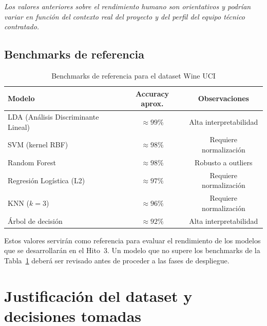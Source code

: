\vspace{1mm}

\textit{Los valores anteriores sobre el rendimiento humano son orientativos y podrían variar 
en función del contexto real del proyecto y del perfil del equipo 
técnico contratado.}

\subsection{Benchmarks de referencia}

\begin{table}[H]
    \centering
        \caption{Benchmarks de referencia para el dataset Wine UCI
             \cite{UCIWine,Aeberhard1994,James2021,Hastie2009,Breiman2001,Cortes1995,Fisher1936}}
    \begin{tabular}{lcc}
        \toprule
        \textbf{Modelo} & \textbf{Accuracy aprox.} & \textbf{Observaciones} \\
        \midrule
        LDA (An\'alisis Discriminante Lineal) & $\approx 99\%$ & Alta interpretabilidad \\
        SVM (kernel RBF)                      & $\approx 98\%$ & Requiere normalizaci\'on \\
        Random Forest                         & $\approx 98\%$ & Robusto a outliers \\
        Regresi\'on Log\'istica (L2)          & $\approx 97\%$ & Requiere normalizaci\'on \\
        KNN ($k=3$)                           & $\approx 96\%$ & Requiere normalizaci\'on \\
        \'Arbol de decisi\'on                 & $\approx 92\%$ & Alta interpretabilidad \\
        \bottomrule
    \end{tabular}
    \label{tab:benchmarks}
\end{table}


\noindent Estos valores servir\'an como referencia para evaluar el rendimiento de los
modelos que se desarrollar\'an en el Hito~3. Un modelo que no supere los benchmarks
de la Tabla~\ref{tab:benchmarks} deber\'a ser revisado antes de proceder a las fases
de despliegue.

\section{Justificaci\'on del dataset y decisiones tomadas}

